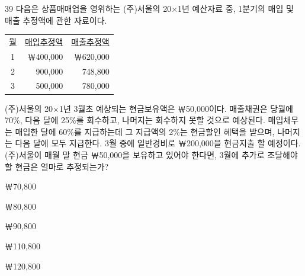 \begin{question}{39}
다음은 상품매매업을 영위하는 (주)서울의 20×1년 예산자료 중, 1분기의 매입 및 매출 추정액에 관한 자료이다.

{\small\centering
\begin{tabular}{|c|r|r|}
\hline
\uline{월} & \multicolumn{1}{c|}{\uline{매입추정액}} & \multicolumn{1}{c|}{\uline{매출추정액}} \\
1 & ￦400,000 & ￦620,000 \\
2 & 900,000 & 748,800 \\
3 & 500,000 & 780,000 \\
\hline
\end{tabular}\par}

(주)서울의 20×1년 3월초 예상되는 현금보유액은 ￦50,000이다. 매출채권은 당월에 70\%, 다음 달에 25\%를 회수하고, 나머지는 회수하지 못할 것으로 예상된다. 매입채무는 매입한 달에 60\%를 지급하는데 그 지급액의 2\%는 현금할인 혜택을 받으며, 나머지는 다음 달에 모두 지급한다. 3월 중에 일반경비로 ￦200,000을 현금지출 할 예정이다. (주)서울이 매월 말 현금 ￦50,000을 보유하고 있어야 한다면, 3월에 추가로 조달해야 할 현금은 얼마로 추정되는가? \par
\begin{choices}
  \item ￦70,800
  \item ￦80,800
  \item ￦90,800
  \item ￦110,800
  \item ￦120,800
\end{choices}
\end{question}
